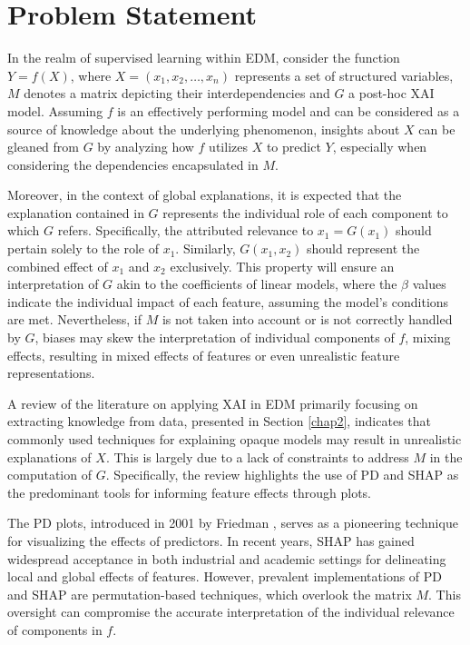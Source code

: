 \section{Problem Statement}

In the realm of supervised learning within EDM, consider the function \( Y = f(X) \), where \( X = (x_1, x_2, \ldots, x_n) \) represents a set of structured variables, \( M \) denotes a matrix depicting their interdependencies and \(G\) a post-hoc XAI model. Assuming \( f \) is an effectively performing model and can be considered as a source of knowledge about the underlying phenomenon, insights about \( X \) can be gleaned from \(G\) by analyzing how \( f \) utilizes \( X \) to predict \( Y \), especially when considering the dependencies encapsulated in \( M \).

Moreover, in the context of global explanations, it is expected that the explanation contained in \(G\) represents the individual role of each component to which \(G\) refers. Specifically, the attributed relevance to \(x_1 = G(x_1)\) should pertain solely to the role of \(x_1\). Similarly, \(G(x_1, x_2)\) should represent the combined effect of \(x_1\) and \(x_2\) exclusively. This property will ensure an interpretation of \(G\) akin to the coefficients of linear models, where the \(\beta\) values indicate the individual impact of each feature, assuming the model's conditions are met. Nevertheless, if \(M\) is not taken into account or is not correctly handled by \(G\), biases may skew the interpretation of individual components of \(f\), mixing effects, resulting in mixed effects of features or even unrealistic feature representations.

A review of the literature on applying XAI in EDM primarily focusing on extracting knowledge from data,  presented in Section \ref{chap2}, indicates that commonly used techniques for explaining opaque models may result in unrealistic explanations of \(X\). This is largely due to a lack of constraints to address \(M\) in the computation of \(G\). Specifically, the review highlights the use of PD and SHAP as the predominant tools for informing feature effects through plots.

The PD plots, introduced in 2001 by Friedman \cite{Friedman2001GreedyMachine.}, serves as a pioneering technique for visualizing the effects of predictors. In recent years, SHAP \cite{10.5555/3295222.3295230} has gained widespread acceptance in both industrial and academic settings \cite{Bhatt2020ExplainableDeployment} for delineating local and global effects of features. However, prevalent implementations of PD and SHAP are permutation-based techniques, which overlook the matrix \(M\). This oversight can compromise the accurate interpretation of the individual relevance of components in \(f\). 

